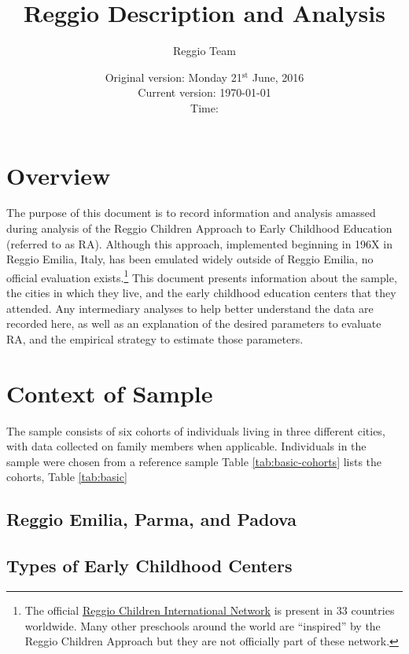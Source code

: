 \documentclass[12pt]{article}
\begin{document}
\title{Reggio Description and Analysis}
\author{Reggio Team}
\date{Original version: Monday  21$^{\text{st}}$ June, 2016 \\ Current version: \today \\ \vspace{1em} Time: \currenttime}
\maketitle

\tableofcontents
\listoftables

\doublespacing

\section{Overview}
The purpose of this document is to record information and analysis amassed during analysis of the Reggio Children Approach to Early Childhood Education (referred to as RA). Although this approach, implemented beginning in 196X in Reggio Emilia, Italy, has been emulated widely outside of Reggio Emilia, no official evaluation exists.\footnote{The official \href{http://www.reggiochildren.it/network/?lang=en}{Reggio Children International Network} is present in 33 countries worldwide. Many other preschools around the world are ``inspired'' by the Reggio Children Approach but they are not officially part of these network.} This document presents information about the sample, the cities in which they live, and the early childhood education centers that they attended. Any intermediary analyses to help better understand the data are recorded here, as well as an explanation of the desired parameters to evaluate RA, and the empirical strategy to estimate those parameters. 


\section{Context of Sample}
The sample consists of six cohorts of individuals living in three different cities, with data collected on family members when applicable. Individuals in the sample were chosen from a reference sample Table \ref{tab:basic-cohorts} lists the cohorts, Table \ref{tab:basic}
\subsection{Reggio Emilia, Parma, and Padova}
\subsection{Types of Early Childhood Centers}
\end{document}
